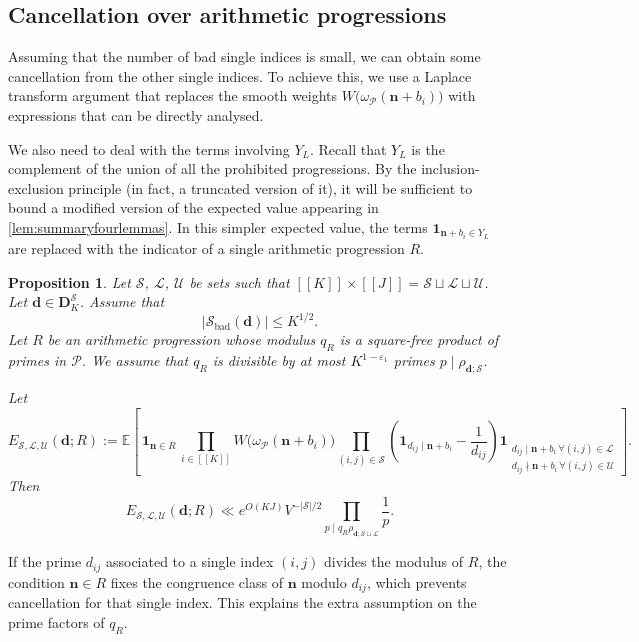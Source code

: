 \documentclass[11pt]{amsart}
\newtheorem{proposition}[theorem]{Proposition}
\theoremstyle{definition}
\renewcommand{\leq}{\leqslant}
\newcommand{\sinterval}[1]{[\![#1]\!] }
\newcommand{\ind}[1]{\mathbf{1}_{#1}}
\newcommand{\eps}{\varepsilon}
\newcommand{\E}{\mathbb{E}}
\newcommand{\primes}{\mathcal{P}}
\renewcommand{\d}{\boldsymbol{d}}
\newcommand{\pcomp}[2]{d_{#1#2}}
\newcommand{\n}{\mathbf{n}}
\newcommand{\cstH}{\eps_1}
\newcommand{\quantity}{\repK^{1-\cstH}}
\newcommand{\curlyL}{V}
\newcommand{\sommespart}{b}
\newcommand{\fprod}[1]{\rho_{#1}}
\newcommand{\lit}{\mathcal{L}}
\newcommand{\unlit}{\mathcal{U}}
\newcommand{\s}{\mathcal{S}}
\newcommand{\fancyD}{\mathbf{D}}
\newcommand{\Ds}{\fancyD^{\s}_{\!\repK}}
\newcommand{\elln}{L}
\newcommand{\Y}{Y_{\!\elln}}
\newcommand{\modulus}{q}
\newcommand{\repR}{J}
\newcommand{\repK}{K}
\newcommand{\newK}{\sinterval{K}}
\newcommand{\newR}{\sinterval{J}}
\newcommand{\kbad}{\s_{\mathrm{bad}}(\d)}
\newcommand{\newerKR}{\newK\times\newR}
\begin{document}
\subsection{Cancellation over arithmetic progressions}

Assuming that the number of bad single indices is small, we can obtain some cancellation from the other single indices. To achieve this, we use a Laplace transform argument that replaces the smooth weights $W\big(\omega_{\primes}(\n+\sommespart_i)\big)$ with expressions that can be directly analysed. 

We also need to deal with the terms involving $\Y$. Recall that $\Y$ is the complement of the union of all the prohibited progressions. By the inclusion-exclusion principle (in fact, a truncated version of it), it will be sufficient to bound a modified version of the expected value appearing in \cref{lem:summaryfourlemmas}. In this simpler expected value, the terms ${\ind{\n+\sommespart_i\in \Y}}$ are replaced with the indicator of a single arithmetic progression $R$. 

\begin{proposition}
\label{prop:cancellationAP}
Let $\s$, $\lit$, $\unlit$ be sets such that $\newerKR = \s\sqcup\lit\sqcup\unlit$. Let $\d\in \Ds$. Assume that
\begin{equation*}
\big|{\kbad}\big| \leq\repK^{1/2}.
\end{equation*}
Let $R$ be an arithmetic progression whose modulus $\modulus_{R}$ is a square-free product of primes in $\primes$. We assume that $\modulus_{R}$ is divisible by at most $\quantity$ primes $p\mid \fprod{\d; \s}$. 

Let
\begin{equation*}
E_{\s,\lit,\unlit}(\d; R) := \E \left[\,\ind{\n\in R}\, \prod_{i\in \newK} W\big(\omega_{\primes}(\n+\sommespart_i)\big)\prod_{(i,j)\in \s} \left(\ind{\pcomp{i}{j}\mid \n + \sommespart_i} - \frac{1}{\pcomp{i}{j}}\right) \ind{\substack{\pcomp{i}{j}\mid \n+\sommespart_i \, \forall (i,j)\in \lit \\ \pcomp{i}{j}\nmid \n+\sommespart_i \, \forall (i,j)\in \unlit}} \right].
\end{equation*}
Then
\begin{equation*}
E_{\s,\lit,\unlit}(\d; R) \ll e^{O(\repK \repR)} \curlyL^{-|\s|/2}  \prod_{p\mid \modulus_{R} \fprod{\d; \s \sqcup \lit}}\frac{1}{p}.
\end{equation*}
\end{proposition}

If the prime $\pcomp{i}{j}$ associated to a single index $(i,j)$ divides the modulus of $R$, the condition $\n \in R$ fixes the congruence class of $\n$ modulo $\pcomp{i}{j}$, which prevents cancellation for that single index. This explains the extra assumption on the prime factors of $\modulus_{R}$.
\end{document}
